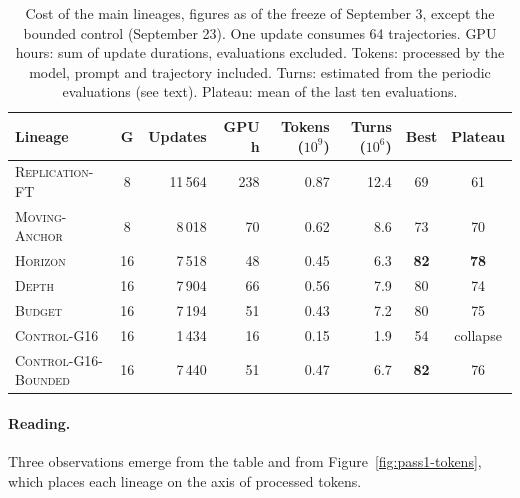 \documentclass[11pt,a4paper]{article}
\begin{document}
\begin{table}[htbp]
\centering
\caption{Cost of the main lineages, figures as of the freeze of September 3, except the bounded control (September 23). One update consumes 64 trajectories. GPU hours: sum of update durations, evaluations excluded. Tokens: processed by the model, prompt and trajectory included. Turns: estimated from the periodic evaluations (see text). Plateau: mean of the last ten evaluations.}
\label{tab:compute}
\footnotesize
\setlength{\tabcolsep}{4pt}
\begin{tabular}{l c r r r r c c}
\toprule
\textbf{Lineage} & $\boldsymbol{G}$ & \textbf{Updates} & \textbf{GPU h} & \textbf{Tokens ($10^9$)} & \textbf{Turns ($10^6$)} & \textbf{Best} & \textbf{Plateau} \\
\midrule
\textsc{Replication-FT} & 8 & 11\,564 & 238 & 0.87 & 12.4 & 69 & 61 \\
\textsc{Moving-Anchor} & 8 & 8\,018 & 70 & 0.62 & 8.6 & 73 & 70 \\
\textsc{Horizon} & 16 & 7\,518 & 48 & 0.45 & 6.3 & \textbf{82} & \textbf{78} \\
\textsc{Depth} & 16 & 7\,904 & 66 & 0.56 & 7.9 & 80 & 74 \\
\textsc{Budget} & 16 & 7\,194 & 51 & 0.43 & 7.2 & 80 & 75 \\
\textsc{Control-G16} & 16 & 1\,434 & 16 & 0.15 & 1.9 & 54 & collapse \\
\textsc{Control-G16-Bounded} & 16 & 7\,440 & 51 & 0.47 & 6.7 & \textbf{82} & 76 \\
\bottomrule
\end{tabular}
\end{table}

\paragraph{Reading.} Three observations emerge from the table and from Figure~\ref{fig:pass1-tokens}, which places each lineage on the axis of processed tokens.
\end{document}
